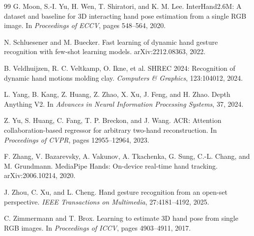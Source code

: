 \documentclass{article}
\begin{document}
\begin{thebibliography}{99}
G. Moon, S.-I. Yu, H. Wen, T. Shiratori, and K. M. Lee.
\newblock InterHand2.6M: A dataset and baseline for 3D interacting hand pose estimation from a single RGB image.
\newblock In \emph{Proceedings of ECCV}, pages 548--564, 2020.

N. Schluesener and M. Buecker.
\newblock Fast learning of dynamic hand gesture recognition with few-shot learning models.
\newblock arXiv:2212.08363, 2022.

B. Veldhuijzen, R. C. Veltkamp, O. Ikne, et al.
\newblock SHREC 2024: Recognition of dynamic hand motions molding clay.
\newblock \emph{Computers \& Graphics}, 123:104012, 2024.

L. Yang, B. Kang, Z. Huang, Z. Zhao, X. Xu, J. Feng, and H. Zhao.
\newblock Depth Anything V2.
\newblock In \emph{Advances in Neural Information Processing Systems}, 37, 2024.

Z. Yu, S. Huang, C. Fang, T. P. Breckon, and J. Wang.
\newblock ACR: Attention collaboration-based regressor for arbitrary two-hand reconstruction.
\newblock In \emph{Proceedings of CVPR}, pages 12955--12964, 2023.

F. Zhang, V. Bazarevsky, A. Vakunov, A. Tkachenka, G. Sung, C.-L. Chang, and M. Grundmann.
\newblock MediaPipe Hands: On-device real-time hand tracking.
\newblock arXiv:2006.10214, 2020.

J. Zhou, C. Xu, and L. Cheng.
\newblock Hand gesture recognition from an open-set perspective.
\newblock \emph{IEEE Transactions on Multimedia}, 27:4181--4192, 2025.

C. Zimmermann and T. Brox.
\newblock Learning to estimate 3D hand pose from single RGB images.
\newblock In \emph{Proceedings of ICCV}, pages 4903--4911, 2017.

\end{thebibliography}
\end{document}
